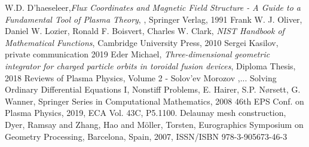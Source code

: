\documentclass[./main.tex]{subfiles}
\begin{document}
\begin{thebibliography}{1}
	\label{chp:bibliography}
	 W.D. D'haeseleer,\textit{Flux Coordinates and Magnetic Field Structure - A Guide to a Fundamental Tool of Plasma Theory},
, Springer Verlag, 1991
	 Frank W. J. Oliver, Daniel W. Lozier, Ronald F. Boisvert, Charles W. Clark, \textit{NIST Handbook of Mathematical Functions}, Cambridge University Press, 2010
	 Sergei Kasilov, private communication 2019
	 Eder Michael, \textit{Three-dimensional geometric integrator
for charged particle orbits in toroidal fusion devices}, Diploma Thesis, 2018
	 Reviews of Plasma Physics, Volume 2 - Solov'ev Morozov ,...
	 Solving Ordinary Differential Equations I, Nonstiff Problems, E. Hairer, S.P. N{\o}rsett, G. Wanner, Springer Series in Computational Mathematics, 2008 
	 46th EPS Conf. on Plasma Physics, 2019, ECA Vol. 43C, P5.1100.
	 Delaunay mesh construction, Dyer, Ramsay and Zhang, Hao and Möller, Torsten, Eurographics Symposium on Geometry Processing, Barcelona, Spain, 2007, ISSN/ISBN 978-3-905673-46-3 
	

\end{thebibliography}
\end{document}
